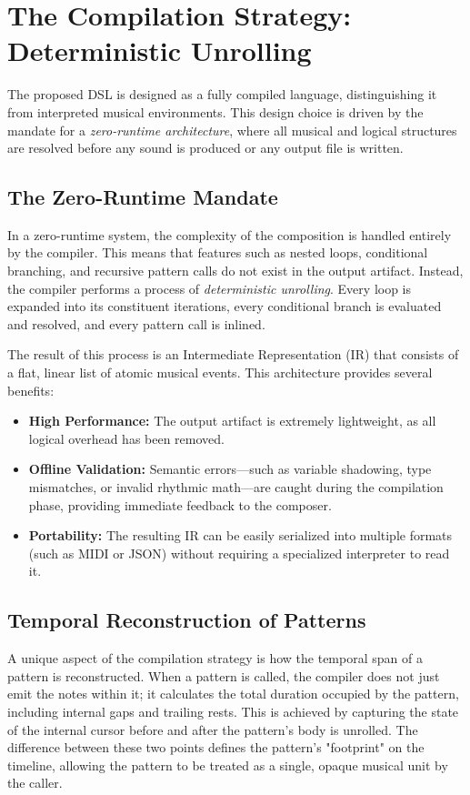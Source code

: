 \section{The Compilation Strategy: Deterministic Unrolling}\label{sec:compilation-strategy}

The proposed DSL is designed as a fully compiled language, distinguishing it from interpreted musical environments.
This design choice is driven by the mandate for a \textit{zero-runtime architecture}, where all musical and
logical structures are resolved before any sound is produced or any output file is written.

\subsection{The Zero-Runtime Mandate}

In a zero-runtime system, the complexity of the composition is handled entirely by the compiler.
This means that features such as nested loops, conditional branching, and recursive pattern calls do not
exist in the output artifact.
Instead, the compiler performs a process of \textit{deterministic unrolling}.
Every loop is expanded into its constituent iterations, every conditional branch is evaluated and resolved,
and every pattern call is inlined.

The result of this process is an Intermediate Representation (IR) that consists of a flat, linear list of
atomic musical events.
This architecture provides several benefits:
\begin{itemize}
  \item \textbf{High Performance:} The output artifact is extremely lightweight, as all logical overhead has
    been removed.
  \item \textbf{Offline Validation:} Semantic errors—such as variable shadowing, type mismatches, or invalid
    rhythmic math—are caught during the compilation phase, providing immediate feedback to the composer.
  \item \textbf{Portability:} The resulting IR can be easily serialized into multiple formats (such as MIDI
    or JSON) without requiring a specialized interpreter to read it.
\end{itemize}

\subsection{Temporal Reconstruction of Patterns}

A unique aspect of the compilation strategy is how the temporal span of a pattern is reconstructed.
When a pattern is called, the compiler does not just emit the notes within it; it calculates the total
duration occupied by the pattern, including internal gaps and trailing rests.
This is achieved by capturing the state of the internal cursor before and after the pattern's body is unrolled.
The difference between these two points defines the pattern's "footprint" on the timeline, allowing the
pattern to be treated as a single, opaque musical unit by the caller.

